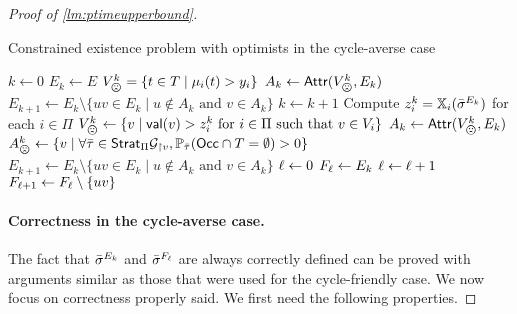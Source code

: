 \begin{proof}[Proof of \cref{lm:ptimeupperbound}]
    
            \begin{algorithm}[t]
        \begin{algorithmic}\caption{Constrained existence problem with optimists in the cycle-averse case}\label{algo:cycleaverse}
                    \State $k \gets 0$
                    \State $E_k\gets E$
                    \State $V_\bad^k = \{t\in T \mid \mu_i(t)> y_i\}$ 
                    \State $A_k \gets \Attr(V^k_\bad, E_k)$
                        \Return{$\No$}
                    \Else
                        \State $E_{k+1} \gets E_k \setminus \{uv\in E_k\mid u\not\in A_k\text{ and }v\in A_k\}$
                        \State $k\gets k+1$
                            \State Compute $z^k_i = \mathbb{X}_i({\bar{\sigma}}^{E_k})$ for each $i \in \Pi$
                            \State $V^k_\bad \gets \{v \mid \val(v) > z_i^k \text{ for } i \in \Pi \text{ such that } v \in V_i\}$
                            \State $A_k \gets \Attr(V^k_\bad, E_k)$
                        \Else
                            \State $A^k_\bad \gets \{v \mid \forall \btau \in \Strat_\Pi\Game_{\|v}, \prob_\btau(\Occ \cap T = \emptyset) > 0\}$
                        \EndIf
                            \Return{$\No$}
                        \Else
                            \State $E_{k+1} \gets E_k \setminus \{uv\in E_k\mid u\notin A_k\text{ and }v\in A_k\}$
                        \EndIf
                    \EndWhile
                    \EndIf
                        \Return{$\No$}
                    \Else
                        \State $\ell \gets 0$
                        \State $F_\ell \gets E_k$
                            \State $\ell \gets \ell+1$
                            \State $F_{\ell+1} \gets F_\ell \setminus \{uv\}$
                        \EndWhile
                    \EndIf
                \EndProcedure
            \end{algorithmic}
        \end{algorithm}

     \paragraph*{Correctness in the cycle-averse case.}
The fact that ${\bar{\sigma}}^{E_k}$ and ${\bar{\sigma}}^{F_\ell}$ are always correctly defined can be proved with arguments similar as those that were used for the cycle-friendly case.
We now focus on correctness properly said.
We first need the following properties.


\end{proof}
